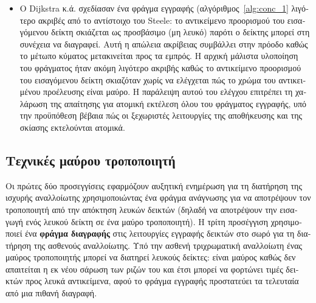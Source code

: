 \begin{greek}
\begin{itemize}
  \item Ο Dijkstra κ.ά. \cite{DBLP:conf/ac/DijkstraLMSS75,
   DBLP:journals/cacm/DijkstraLMSS78} σχεδίασαν ένα φράγμα εγγραφής
   (αλγόριθμος~\ref{alg:conc_1} λιγότερο
   ακριβές από το αντίστοιχο του Steele: το αντικείμενο προορισμού
   του εισαγόμενου δείκτη σκιάζεται ως προσβάσιμο (μη λευκό) παρότι
   ο δείκτης μπορεί στη συνέχεια να διαγραφεί. Αυτή η απώλεια
   ακρίβειας συμβάλλει στην πρόοδο καθώς το μέτωπο κύματος
   μετακινείται προς τα εμπρός. Η αρχική μάλιστα υλοποίηση του
   φράγματος ήταν ακόμη λιγότερο ακριβής καθώς το αντικείμενο
   προορισμού του εισαγόμενου δείκτη σκιαζόταν χωρίς να ελέγχεται
   πώς το χρώμα του αντικειμένου προέλευσης είναι μαύρο. Η παράλειψη
   αυτού του ελέγχου επιτρέπει τη χαλάρωση της απαίτησης για ατομική
   εκτέλεση όλου του φράγματος εγγραφής, υπό την προϋπόθεση βέβαια
   πώς οι ξεχωριστές λειτουργίες της αποθήκευσης και της σκίασης
   εκτελούνται ατομικά.
\end{itemize}

\subsection{Τεχνικές μαύρου τροποποιητή}
Οι πρώτες δύο προσεγγίσεις εφαρμόζουν αυξητική ενημέρωση για
τη διατήρηση της ισχυρής αναλλοίωτης χρησιμοποιώντας ένα φράγμα
ανάγνωσης για να αποτρέψουν τον τροποποιητή από την απόκτηση
λευκών δεικτών (δηλαδή να αποτρέψουν την εισαγωγή ενός λευκού
δείκτη σε ένα μαύρο τροποποιητή). Η τρίτη προσέγγιση χρησιμοποιεί
ένα \textbf{φράγμα διαγραφής} στις λειτουργίες εγγραφής δεικτών
στο σωρό για τη διατήρηση της ασθενούς αναλλοίωτης. Υπό την
ασθενή τριχρωματική αναλλοίωτη ένας μαύρος τροποποιητής μπορεί
να διατηρεί λευκούς δείκτες: είναι μαύρος καθώς δεν απαιτείται
η εκ νέου σάρωση των ριζών του και έτσι μπορεί να φορτώνει
τιμές δεικτών προς λευκά αντικείμενα, αφού το φράγμα εγγραφής
προστατεύει τα τελευταία από μια πιθανή διαγραφή.


\end{greek}
